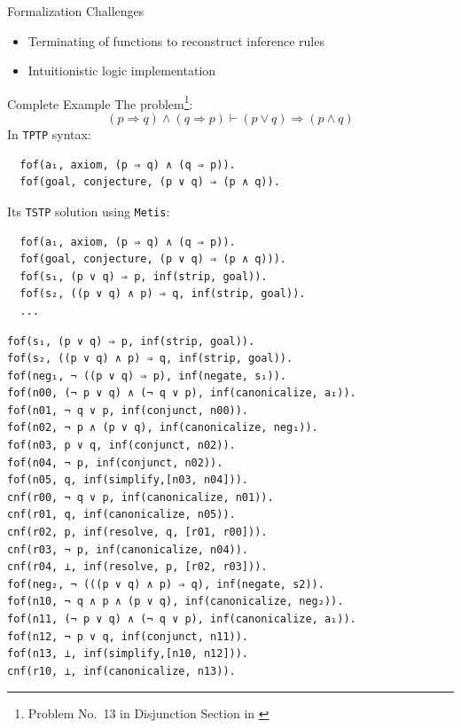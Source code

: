 \documentclass[10pt, xetex, hyperref={pdfpagelabels=false}]{beamer}
\newcommand{\prg}[1]{\texttt{#1}\xspace}
\newcommand{\Metis}{\prg{Metis}}
\newcommand{\len}[1]{\texttt{#1}\xspace}
\newcommand{\TPTP}{\len{TPTP}}
\newcommand{\TSTP}{\len{TSTP}}
\begin{document}

\begin{frame}{Formalization Challenges}
\begin{itemize}
  \item Terminating of functions to reconstruct inference rules
  \item Intuitionistic logic implementation
\end{itemize}
\end{frame}

\begin{frame}[fragile]{Complete Example}
The problem\footnote{Problem No.~13 in Disjunction Section in \cite{Prieto-Cubides2017}}:
\begin{equation*}
(p \Rightarrow q) \wedge (q \Rightarrow p) ⊢ (p \vee q) \Rightarrow (p \wedge q)
\end{equation*}
In \TPTP syntax:
\begin{verbatim}
  fof(a₁, axiom, (p ⇒ q) ∧ (q ⇒ p)).
  fof(goal, conjecture, (p ∨ q) ⇒ (p ∧ q)).
\end{verbatim}
Its \TSTP solution using \Metis:
\begin{verbatim}
  fof(a₁, axiom, (p ⇒ q) ∧ (q ⇒ p)).
  fof(goal, conjecture, (p ∨ q) ⇒ (p ∧ q))).
  fof(s₁, (p ∨ q) ⇒ p, inf(strip, goal)).
  fof(s₂, ((p ∨ q) ∧ p) ⇒ q, inf(strip, goal)).
  ...
\end{verbatim}
\end{frame}

\begin{frame}
\begin{verbatim}
fof(s₁, (p ∨ q) ⇒ p, inf(strip, goal)).
fof(s₂, ((p ∨ q) ∧ p) ⇒ q, inf(strip, goal)).
fof(neg₁, ¬ ((p ∨ q) ⇒ p), inf(negate, s₁)).
fof(n00, (¬ p ∨ q) ∧ (¬ q ∨ p), inf(canonicalize, a₁)).
fof(n01, ¬ q ∨ p, inf(conjunct, n00)).
fof(n02, ¬ p ∧ (p ∨ q), inf(canonicalize, neg₁)).
fof(n03, p ∨ q, inf(conjunct, n02)).
fof(n04, ¬ p, inf(conjunct, n02)).
fof(n05, q, inf(simplify,[n03, n04])).
cnf(r00, ¬ q ∨ p, inf(canonicalize, n01)).
cnf(r01, q, inf(canonicalize, n05)).
cnf(r02, p, inf(resolve, q, [r01, r00])).
cnf(r03, ¬ p, inf(canonicalize, n04)).
cnf(r04, ⊥, inf(resolve, p, [r02, r03])).
fof(neg₂, ¬ (((p ∨ q) ∧ p) ⇒ q), inf(negate, s2)).
fof(n10, ¬ q ∧ p ∧ (p ∨ q), inf(canonicalize, neg₂)).
fof(n11, (¬ p ∨ q) ∧ (¬ q ∨ p), inf(canonicalize, a₁)).
fof(n12, ¬ p ∨ q, inf(conjunct, n11)).
fof(n13, ⊥, inf(simplify,[n10, n12])).
cnf(r10, ⊥, inf(canonicalize, n13)).
\end{verbatim}
\end{frame}
\end{document}
